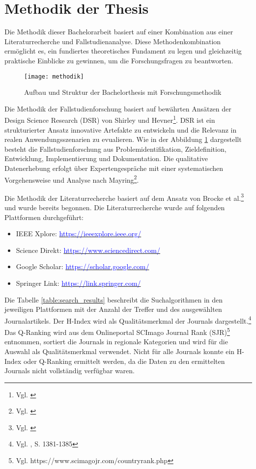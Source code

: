 
\section{Methodik der Thesis}

Die Methodik dieser Bachelorarbeit basiert auf einer Kombination aus einer Literaturrecherche und Fallstudienanalyse. Diese Methodenkombination ermöglicht es, ein fundiertes theoretisches Fundament zu legen und gleichzeitig praktische Einblicke zu gewinnen, um die Forschungsfragen zu beantworten.

\begin{figure}[H]
    \centering
    \texttt{[image: methodik]}
    \captionsetup{font=scriptsize}
    \caption{Aufbau und Struktur der Bachelorthesis mit Forschungsmethodik}
    \label{fig:methodik}
\end{figure}

Die Methodik der Fallstudienforschung basiert auf bewährten Ansätzen der Design Science Research (DSR) von Shirley und Hevner\footnote{Vgl. \cite{Shirley&Hevner2013}}. DSR ist ein strukturierter Ansatz innovative Artefakte zu entwickeln und die Relevanz in realen Anwendungsszenarien zu evualieren. Wie in der Abbildung \ref{fig:methodik} dargestellt besteht die Fallstudienforschung aus Problemidentifikation, Zieldefinition, Entwicklung, Implementierung und Dokumentation. Die qualitative Datenerhebung erfolgt über Expertengespräche mit einer systematischen Vorgehensweise und Analyse nach Mayring\footnote{Vgl. \cite{Mayring2019}}. 

Die Methodik der Literaturrecherche basiert auf dem Ansatz von Brocke et al.\footnote{Vgl. \cite{Brocke2015}} und wurde bereits begonnen. Die Literaturrecherche wurde auf folgenden Plattformen durchgeführt:

\begin{itemize}
    \item IEEE Xplore: \underline{\textcolor{blue}{https://ieeexplore.ieee.org/}}
    \item Science Direkt: \underline{\textcolor{blue}{https://www.sciencedirect.com/}}
    \item Google Scholar: \underline{\textcolor{blue}{https://scholar.google.com/}}
    \item Springer Link: \underline{\textcolor{blue}{https://link.springer.com/}}
\end{itemize}

Die Tabelle \ref{table:search_results} beschreibt die Suchalgorithmen in den jeweiligen Plattformen mit der Anzahl der Treffer und des ausgewählten Journalartikels. Der H-Index wird als Qualitätsmerkmal der Journals dargestellt.\footnote{Vgl. \cite{Bornmann2007}, S. 1381-1385} Das Q-Ranking wird aus dem Onlineportal SCImago Journal Rank (SJR)\footnote{Vgl. https://www.scimagojr.com/countryrank.php } entnommen, sortiert die Journals in regionale Kategorien und wird für die Auswahl als Qualitätsmerkmal verwendet. Nicht für alle Journals konnte ein H-Index oder Q-Ranking ermittelt werden, da die Daten zu den ermittelten Journals nicht vollständig verfügbar waren.

